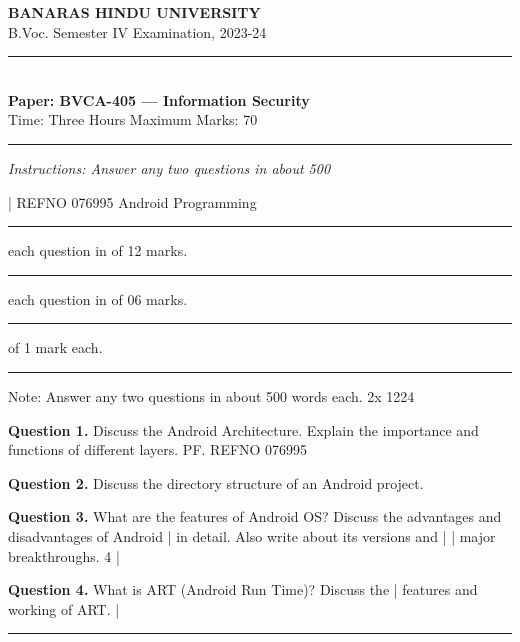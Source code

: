 \documentclass[11pt,a4paper]{article}
\begin{document}
\begin{center}
  {\large\bfseries BANARAS HINDU UNIVERSITY}\\[2pt]
  {\normalsize B.Voc. Semester IV Examination, 2023-24}\\[6pt]
  \rule{0.8\linewidth}{0.5pt}\\[6pt]
  {\large\bfseries Paper: BVCA-405 --- Information Security}\\[4pt]
  {\normalsize Time: Three Hours \hfill Maximum Marks: 70}
\end{center}

\rule{\linewidth}{0.4pt}

\smallskip
\noindent\textit{Instructions: Answer any two questions in about 500}

\bigskip

| REFNO 076995
Android Programming

\bigskip{}
\rule{\linewidth}{0.4pt}\smallskip

each question in of 12 marks.

\bigskip{}
\rule{\linewidth}{0.4pt}\smallskip

each question in of 06 marks.

\bigskip{}
\rule{\linewidth}{0.4pt}\smallskip

of 1 mark each.

\bigskip{}
\rule{\linewidth}{0.4pt}\smallskip

Note: Answer any two questions in about 500
words each. 2x 1224

\medskip\noindent\textbf{Question 1.} Discuss the Android Architecture. Explain the
importance and functions of different layers.
PF.
REFNO 076995

\medskip\noindent\textbf{Question 2.} Discuss the directory structure of an Android
project.

\medskip\noindent\textbf{Question 3.} What are the features of Android OS? Discuss
the advantages and disadvantages of Android
| in detail. Also write about its versions and |
| major breakthroughs. 4 |

\medskip\noindent\textbf{Question 4.} What is ART (Android Run Time)? Discuss the |
features and working of ART. |

\bigskip{}
\rule{\linewidth}{0.4pt}\smallskip
\end{document}
